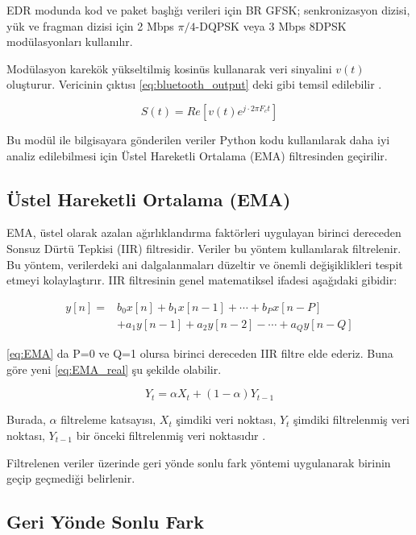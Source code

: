 EDR modunda kod ve paket başlığı verileri için BR GFSK; senkronizasyon dizisi, yük ve fragman dizisi için 2 Mbps $\pi/4$-DQPSK veya 3 Mbps 8DPSK modülasyonları kullanılır.

Modülasyon karekök yükseltilmiş kosinüs kullanarak veri sinyalini $v(t)$ oluşturur.
Vericinin çıktısı \eqref{eq:bluetooth_output} deki gibi temsil edilebilir \cite{bluetooth2007core}.

\begin{equation}
    S(t)=Re\left[v(t)e^{j\cdot 2\pi F_ct} \right]
    \label{eq:bluetooth_output}
\end{equation}

Bu modül ile bilgisayara gönderilen veriler Python kodu kullanılarak daha iyi analiz edilebilmesi için Üstel Hareketli Ortalama (EMA) filtresinden geçirilir.

\subsection{Üstel Hareketli Ortalama (EMA)}

EMA, üstel olarak azalan ağırlıklandırma faktörleri uygulayan birinci dereceden Sonsuz Dürtü Tepkisi (IIR) filtresidir. Veriler bu yöntem kullanılarak filtrelenir. Bu yöntem, verilerdeki ani dalgalanmaları düzeltir ve önemli değişiklikleri tespit etmeyi kolaylaştırır. IIR filtresinin genel matematiksel ifadesi aşağıdaki gibidir:

\begin{align}
 y[n] = & b_0 x[n] + b_1 x[n-1] + \cdots + b_P x[n-P] \label{eq:EMA} \\ 
      & + a_1 y[n-1] + a_2 y[n-2] - \cdots + a_Q y[n-Q] \nonumber
\end{align}


\eqref{eq:EMA} da P=0 ve Q=1 olursa birinci dereceden IIR filtre elde ederiz. Buna göre yeni \eqref{eq:EMA_real} şu şekilde olabilir.

\begin{equation}
    Y_t=\alpha X_t + (1-\alpha)Y_{t-1}
    \label{eq:EMA_real}
\end{equation}

Burada, \(\alpha\) filtreleme katsayısı, \(X_t\) şimdiki veri noktası, \(Y_t\) şimdiki filtrelenmiş veri noktası, \(Y_{t-1}\) bir önceki filtrelenmiş veri noktasıdır \cite{EMA}.

Filtrelenen veriler üzerinde geri yönde sonlu fark yöntemi uygulanarak birinin geçip geçmediği belirlenir.

\subsection{Geri Yönde Sonlu Fark}

